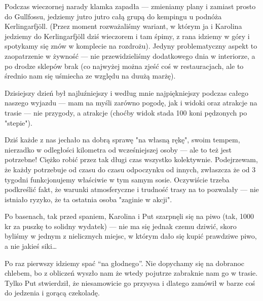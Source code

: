 Podczas wieczornej narady klamka zapadła --- zmieniamy plany i zamiast prosto do Gullfossu, jedziemy jutro jutro całą grupą do kempingu u podnóża Kerlingarfjöll. (Przez moment rozważaliśmy wariant, w którym ja i Karolina jedziemy do Kerlingarfjöll dziś wieczorem i tam śpimy, z rana idziemy w góry i spotykamy się znów w komplecie na rozdrożu). Jedyny problematyczny aspekt to zaopatrzenie w żywność --- nie przewidzieliśmy dodatkowego dnia w interiorze, a po drodze sklepów brak (co najwyżej można zjeść coś w restauracjach, ale to średnio nam się uśmiecha ze względu na duużą marżę).

Dzisiejszy dzień był najluźniejszy i według mnie najpiękniejszy podczas całego naszego wyjazdu --- mam na myśli zarówno pogodę, jak i widoki oraz atrakcje na trasie --- nie przygody, a atrakcje (choćby widok stada 100 koni pędzonych po "stepie").

Dziś każde z nas jechało na dobrą sprawę "na własną rękę", swoim tempem, nierzadko w odległości kilometra od wcześniejszej osoby --- ale to też jest potrzebne! Ciężko robić przez tak długi czas wszystko kolektywnie. Podejrzewam, że każdy potrzebuje od czasu do czasu odpoczynku od innych, zwłaszcza że od 3 tygodni funkcjonujemy właściwie w tym samym sosie. Oczywiście trzeba podkreślić fakt, że warunki atmosferyczne i trudność trasy na to pozwalały --- nie istniało ryzyko, że ta ostatnia osoba "zaginie w akcji".

Po basenach, tak przed spaniem, Karolina i Put szarpnęli się na piwo (tak, 1000 kr za puszkę to solidny wydatek) --- nie ma się jednak czemu dziwić, skoro byliśmy w jednym z nielicznych miejsc, w którym dało się kupić prawdziwe piwo, a nie jakieś siki…

Po raz pierwszy idziemy spać “na głodnego”. Nie dopychamy się na dobranoc chlebem, bo z obliczeń wyszło nam że wtedy pojutrze zabraknie nam go w trasie. Tylko Put stwierdził, że niesamowicie go przysysa i dlatego zamówił w barze coś do jedzenia i gorącą czekoladę.
